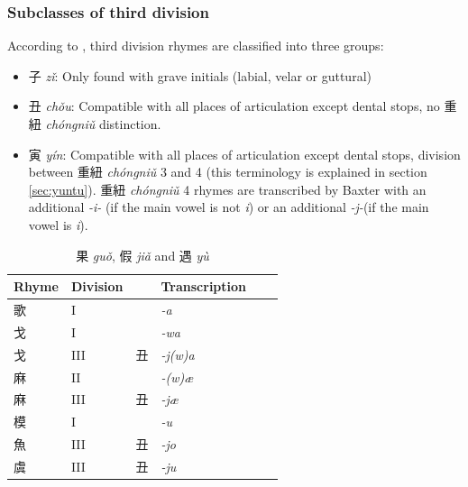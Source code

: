 \documentclass[oneside,a4paper,11pt]{article}
\newcommand{\ipa}[1]{{\phon\textit{#1}}}
\newcommand{\zh}[1]{{\cn #1}}
\newcommand{\zhc}[2]{\zh{#1} \ipa{#2}}
\begin{document}
\subsubsection{Subclasses of third division} \label{sec:third}

According to \citet{lirong56qy}, third division rhymes are classified into three groups:

\begin{itemize}
\item \zhc{子}{zǐ}: Only found with grave initials (labial, velar or guttural)
\item \zhc{丑}{chǒu}: Compatible with all places of articulation except dental stops, no \zhc{重紐}{chóngniǔ} distinction.
\item \zhc{寅}{yín}: Compatible with all places of articulation except dental stops, division between \zhc{重紐}{chóngniǔ} 3 and 4 (this terminology is explained in section \ref{sec:yuntu}). \zhc{重紐}{chóngniǔ} 4 rhymes are transcribed by Baxter with an additional \ipa{-i-} (if the main vowel is not \ipa{i}) or an additional \ipa{-j-}(if the main vowel is \ipa{i}).
\end{itemize} 

\begin{table}[H]
\caption{\zhc{果}{guǒ}, \zhc{假}{jiǎ} and \zhc{遇}{yù}} \centering \label{tab:guo}
\begin{tabular}{llllll}
\toprule
Rhyme & Division & & Transcription \\
\midrule
\zh{歌} &	I &	&	\ipa{-a} &	\\
\zh{戈} &	I &	&	\ipa{-wa} &	\\
\zh{戈} &	III &	\zh{丑} &	\ipa{-j(w)a} &	\\
\midrule
\zh{麻} &	II &	&	\ipa{-(w)æ} &	\\
\zh{麻} &	III &	\zh{丑} &	\ipa{-jæ} &	\\
\midrule
\zh{模} &	I &	&	\ipa{-u} &	\\
\zh{魚} &	III &	\zh{丑} &	\ipa{-jo} &	\\
\zh{虞} &	III &	\zh{丑} &	\ipa{-ju} &	\\
\bottomrule
\end{tabular}
\end{table}
\end{document}

